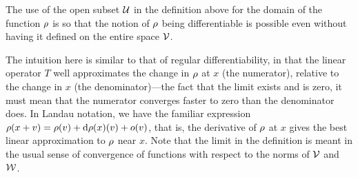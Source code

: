 \begin{remark}
  The use of the open subset ${\mathcal U}$ in the definition above for the domain of the function $\rho$ is so that the notion of $\rho$ being differentiable is possible even without having it defined on the entire space ${\mathcal V}$.
\end{remark}

\pagebreak
{}
The intuition here is similar to that of regular differentiability, in that the linear operator $T$ well approximates the change in $\rho$ at $x$ (the numerator), relative to the change in $x$ (the denominator)---the fact that the limit exists and is zero, it must mean that the numerator converges faster to zero than the denominator does.
In Landau notation, we have the familiar expression $\rho(x+v) = \rho(v) + \text{d} \rho(x)(v) + o(v)$, that is, the derivative of $\rho$ at $x$ gives the best linear approximation to $\rho$ near $x$.
Note that the limit in the definition is meant in the usual sense of convergence of functions with respect to the norms of ${\mathcal V}$ and ${\mathcal W}$.

